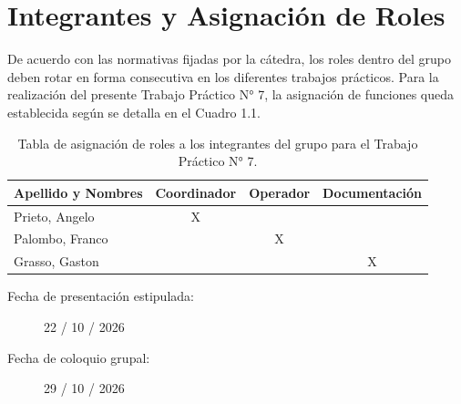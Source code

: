 \chapter{Integrantes y Asignación de Roles}

De acuerdo con las normativas fijadas por la cátedra, los roles dentro del grupo deben rotar en forma consecutiva en los diferentes trabajos prácticos. Para la realización del presente Trabajo Práctico N° 7, la asignación de funciones queda establecida según se detalla en el Cuadro 1.1.

\begin{table}[!ht]
    \centering
    \begin{tabular}{lccc}
        \toprule
        \textbf{Apellido y Nombres} & \textbf{Coordinador} & \textbf{Operador} & \textbf{Documentación} \\
        \midrule
        Prieto, Angelo              & X                    &                   &                        \\
        Palombo, Franco             &                      & X                 &                        \\
        Grasso, Gaston              &                      &                   & X                      \\
        \bottomrule
    \end{tabular}
    \caption{Tabla de asignación de roles a los integrantes del grupo para el Trabajo Práctico N° 7.}
    \label{tab.roles:tp7}
\end{table}

\begin{description}
    \item[Fecha de presentación estipulada:] 22 / 10 / 2026
    \item[Fecha de coloquio grupal:] 29 / 10 / 2026
\end{description}
